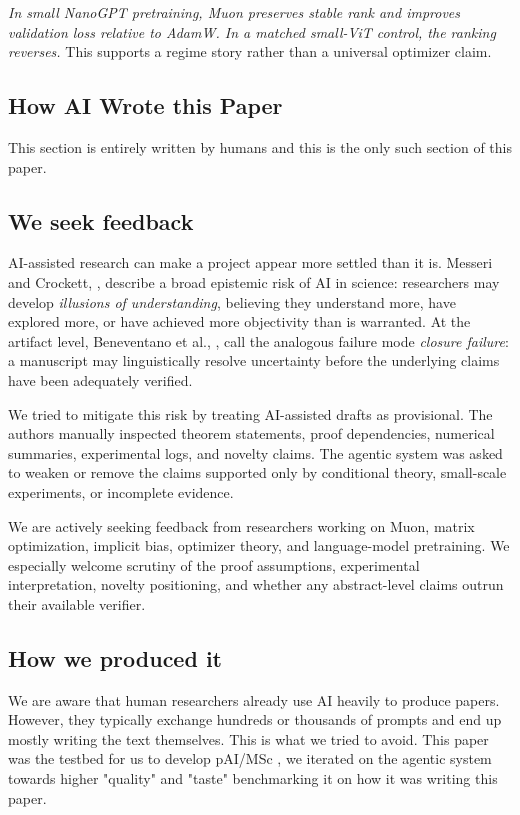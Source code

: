 \documentclass{article}
\begin{document}
\textit{In small NanoGPT pretraining, Muon preserves stable rank and improves validation loss relative to AdamW. In a matched small-ViT control, the ranking reverses.}
This supports a regime story rather than a universal optimizer claim.





\newpage
\begin{summarybox}
\section{How AI Wrote this Paper}
\label{sec:pai}
This section is entirely written by humans and this is the only such section of this paper.

\subsection{We seek feedback}
\label{sec:we_seek_feedback}

AI-assisted research can make a project appear more settled than it is. 
Messeri and Crockett, \citep{messeri2024artificial}, describe a broad epistemic risk of AI in science: researchers may develop \emph{illusions of understanding}, believing they understand more, have explored more, or have achieved more objectivity than is warranted. 
At the artifact level, Beneventano et al., \citep{beneventano2026agent}, call the analogous failure mode \emph{closure failure}: a manuscript may linguistically resolve uncertainty before the underlying claims have been adequately verified.

We tried to mitigate this risk by treating AI-assisted drafts as provisional. 
The authors manually inspected theorem statements, proof dependencies, numerical summaries, experimental logs, and novelty claims. 
The agentic system was asked to weaken or remove the claims supported only by conditional theory, small-scale experiments, or incomplete evidence.

We are actively seeking feedback from researchers working on Muon, matrix optimization, implicit bias, optimizer theory, and language-model pretraining. 
We especially welcome scrutiny of the proof assumptions, experimental interpretation, novelty positioning, and whether any abstract-level claims outrun their available verifier.

\subsection{How we produced it}
We are aware that human researchers already use AI heavily to produce papers. However, they typically exchange hundreds or thousands of prompts and end up mostly writing the text themselves. This is what we tried to avoid. This paper was the testbed for us to develop pAI/MSc \citep{abdelmoneum2026paimsc}, we iterated on the agentic system towards higher "quality" and "taste" benchmarking it on how it was writing this paper.


\end{summarybox}
\end{document}

